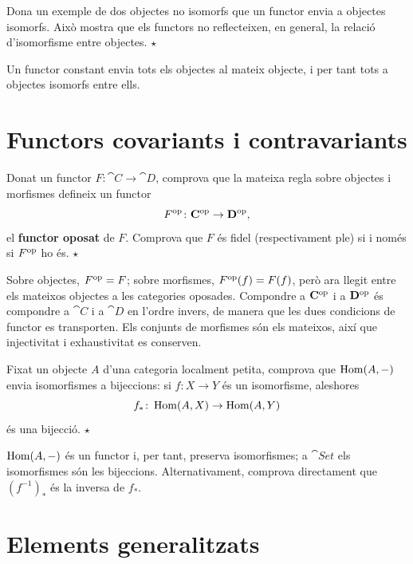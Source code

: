 \begin{exercici}
Dona un exemple de dos objectes no isomorfs que un functor envia a objectes isomorfs. Això mostra que els functors no reflecteixen, en general, la relació d'isomorfisme entre objectes. \hfill{\normalfont$\star$}
\begin{indicacio}
Un functor constant envia tots els objectes al mateix objecte, i per tant tots a objectes isomorfs entre ells.
\end{indicacio}
\end{exercici}

\section{Functors covariants i contravariants}

\begin{exercici}
Donat un functor $F\colon\cat{C}\to\cat{D}$, comprova que la mateixa regla sobre objectes i morfismes defineix un functor
\[
F^{\mathrm{op}}\colon\mathbf{C}^{\mathrm{op}}\to\mathbf{D}^{\mathrm{op}},
\]
el \textbf{functor oposat} de $F$. Comprova que $F$ és fidel (respectivament ple) si i només si $F^{\mathrm{op}}$ ho és. \hfill{\normalfont$\star$}
\begin{indicacio}
Sobre objectes, $F^{\mathrm{op}}=F$; sobre morfismes, $F^{\mathrm{op}}(f)=F(f)$, però ara llegit entre els mateixos objectes a les categories oposades. Compondre a $\mathbf{C}^{\mathrm{op}}$ i a $\mathbf{D}^{\mathrm{op}}$ és compondre a $\cat{C}$ i a $\cat{D}$ en l'ordre invers, de manera que les dues condicions de functor es transporten. Els conjunts de morfismes són els mateixos, així que injectivitat i exhaustivitat es conserven.
\end{indicacio}
\end{exercici}

\begin{exercici}
Fixat un objecte $A$ d'una categoria localment petita, comprova que $\operatorname{Hom}(A,-)$ envia isomorfismes a bijeccions: si $f\colon X\to Y$ és un isomorfisme, aleshores
\[
f_*\colon\operatorname{Hom}(A,X)\to\operatorname{Hom}(A,Y)
\]
és una bijecció. \hfill{\normalfont$\star$}
\begin{indicacio}
$\operatorname{Hom}(A,-)$ és un functor i, per tant, preserva isomorfismes; a $\cat{Set}$ els isomorfismes són les bijeccions. Alternativament, comprova directament que $(f^{-1})_*$ és la inversa de $f_*$.
\end{indicacio}
\end{exercici}

\section{Elements generalitzats}

